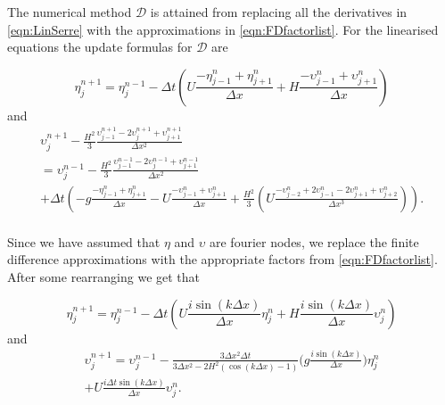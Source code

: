 The numerical method $\mathcal{D}$ is attained from replacing all the derivatives in \eqref{eqn:LinSerre} with the approximations in \eqref{eqn:FDfactorlist}. For the linearised equations the update formulas for $\mathcal{D}$ are

	\begin{equation*}
	\eta^{n+1}_j = \eta^{n-1}_j - \Delta t \left(U \frac{- \eta^{n}_{j-1} + \eta^{n}_{j+1} }{\Delta x} + H \frac{- \upsilon^{n}_{j-1} + \upsilon^{n}_{j+1}}{\Delta x}\right)
	\end{equation*}
	and
	\begin{multline*}
	\upsilon^{n+1}_j - \frac{H^2}{3}\frac{\upsilon^{n+1}_{j-1} -2\upsilon^{n+1}_{j} +\upsilon^{n+1}_{j+1} }{\Delta x^2} 
	\\ =  \upsilon^{n-1}_j - \frac{H^2}{3}\frac{\upsilon^{n-1}_{j-1} -2\upsilon^{n-1}_{j} +\upsilon^{n-1}_{j+1}}{\Delta x^2}   \\+  \Delta t\left(- g\frac{-\eta^n_{j-1} + \eta^n_{j+1} }{\Delta x}   - U\frac{-\upsilon^n_{j-1} + \upsilon^n_{j+1} }{\Delta x} + \frac{H^2}{3}\left(U \frac{-\upsilon^{n}_{j-2} +2\upsilon^{n}_{j-1} -2\upsilon^{n}_{j+1} +\upsilon^{n}_{j+2}}{\Delta x^3}  \right)\right).  \\
	\end{multline*}


Since we have assumed that $\eta$ and $\upsilon$ are fourier nodes, we replace the finite difference approximations with the appropriate factors from \eqref{eqn:FDfactorlist}. After some rearranging we get that

\begin{equation*}
\eta^{n+1}_j = \eta^{n-1}_j - \Delta t \left(U  \frac{i \sin\left(k \Delta x\right)}{\Delta x}\eta^n_j + H\frac{i \sin\left(k \Delta x\right)}{\Delta x} \upsilon^n_j \right) 
\end{equation*}
and
\begin{multline*}
\upsilon^{n+1}_j  =  \upsilon^{n-1}_j  -  \frac{3 \Delta x^2\Delta t}{3 \Delta x^2 -2{H^2} \left( \cos\left(k \Delta x\right) - 1 \right)}\bigg( g \frac{i \sin\left(k \Delta x\right)}{\Delta x}     \bigg) \eta^n_j\\ + U\frac{i \Delta t \sin\left(k \Delta x\right)}{\Delta x} \upsilon^n_j.  \\
\end{multline*}
 
